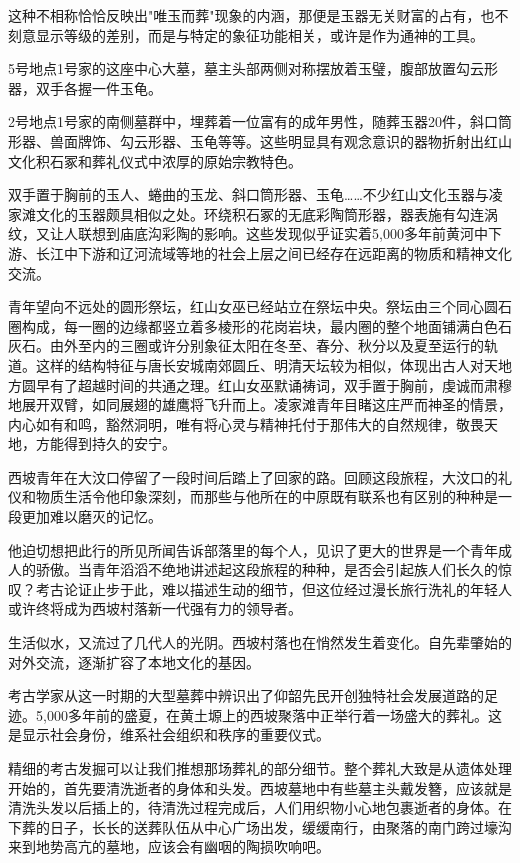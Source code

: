 这种不相称恰恰反映出"唯玉而葬"现象的内涵，那便是玉器无关财富的占有，也不刻意显示等级的差别，而是与特定的象征功能相关，或许是作为通神的工具。

5号地点1号家的这座中心大墓，墓主头部两侧对称摆放着玉璧，腹部放置勾云形器，双手各握一件玉龟。

2号地点1号家的南侧墓群中，埋葬着一位富有的成年男性，随葬玉器20件，斜口筒形器、兽面牌饰、勾云形器、玉龟等等。这些明显具有观念意识的器物折射出红山文化积石冢和葬礼仪式中浓厚的原始宗教特色。

双手置于胸前的玉人、蜷曲的玉龙、斜口筒形器、玉龟……不少红山文化玉器与凌家滩文化的玉器颇具相似之处。环绕积石冢的无底彩陶筒形器，器表施有勾连涡纹，又让人联想到庙底沟彩陶的影响。这些发现似乎证实着5,000多年前黄河中下游、长江中下游和辽河流域等地的社会上层之间已经存在远距离的物质和精神文化交流。

青年望向不远处的圆形祭坛，红山女巫已经站立在祭坛中央。祭坛由三个同心圆石圈构成，每一圈的边缘都竖立着多棱形的花岗岩块，最内圈的整个地面铺满白色石灰石。由外至内的三圈或许分别象征太阳在冬至、春分、秋分以及夏至运行的轨道。这样的结构特征与唐长安城南郊圆丘、明清天坛较为相似，体现出古人对天地方圆早有了超越时间的共通之理。红山女巫默诵祷词，双手置于胸前，虔诚而肃穆地展开双臂，如同展翅的雄鹰将飞升而上。凌家滩青年目睹这庄严而神圣的情景，内心如有和鸣，豁然洞明，唯有将心灵与精神托付于那伟大的自然规律，敬畏天地，方能得到持久的安宁。

西坡青年在大汶口停留了一段时间后踏上了回家的路。回顾这段旅程，大汶口的礼仪和物质生活令他印象深刻，而那些与他所在的中原既有联系也有区别的种种是一段更加难以磨灭的记忆。

他迫切想把此行的所见所闻告诉部落里的每个人，见识了更大的世界是一个青年成人的骄傲。当青年滔滔不绝地讲述起这段旅程的种种，是否会引起族人们长久的惊叹？考古论证止步于此，难以描述生动的细节，但这位经过漫长旅行洗礼的年轻人或许终将成为西坡村落新一代强有力的领导者。

生活似水，又流过了几代人的光阴。西坡村落也在悄然发生着变化。自先辈肇始的对外交流，逐渐扩容了本地文化的基因。

考古学家从这一时期的大型墓葬中辨识出了仰韶先民开创独特社会发展道路的足迹。5,000多年前的盛夏，在黄土塬上的西坡聚落中正举行着一场盛大的葬礼。这是显示社会身份，维系社会组织和秩序的重要仪式。

精细的考古发掘可以让我们推想那场葬礼的部分细节。整个葬礼大致是从遗体处理开始的，首先要清洗逝者的身体和头发。西坡墓地中有些墓主头戴发簪，应该就是清洗头发以后插上的，待清洗过程完成后，人们用织物小心地包裹逝者的身体。在下葬的日子，长长的送葬队伍从中心广场出发，缓缓南行，由聚落的南门跨过壕沟来到地势高亢的墓地，应该会有幽咽的陶损吹响吧。

